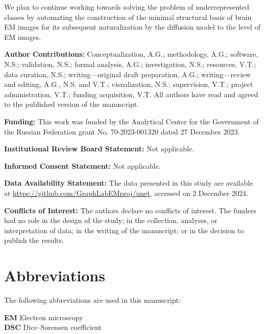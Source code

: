 \documentclass[journal,article,submit,pdftex,moreauthors]{Definitions/mdpi}
\begin{document}
We plan to continue working towards solving the problem of underrepresented classes by automating the construction of the minimal structural basis of brain EM images for its subsequent naturalization by the diffusion model to the level of EM images.

\vspace{18pt}

{\small
\noindent \textbf{Author Contributions:} Conceptualization, A.G.; methodology, A.G.; software, N.S.; validation, N.S.; formal analysis, A.G.; investigation, N.S.; resources, V.T.; data curation, N.S.; writing—original draft preparation, A.G.; writing—review and editing, A.G., N.S. and V.T.; visualization, N.S.; supervision, V.T.; project administration, V.T.; funding acquisition, V.T. All authors have read and agreed to the published version of the manuscript.

\vspace{6pt}

\noindent \textbf{Funding:} This work was funded by the Analytical Center for the Government of the Russian Federation grant No. 70-2023-001320 dated 27 December 2023.

\vspace{6pt}

\noindent \textbf{Institutional Review Board Statement:} Not applicable.

\vspace{6pt}

\noindent \textbf{Informed Consent Statement:} Not applicable.

\vspace{6pt}

\noindent \textbf{Data Availability Statement:} The data presented in this study are available at \url{https://github.com/GraphLabEMproj/unet}, accessed on 2 December 2024.

\vspace{6pt}

\noindent \textbf{Conflicts of Interest:} The authors declare no conflicts of interest. The funders had no role in the design of the study; in the collection, analyses, or interpretation of data; in the writing of the manuscript; or in the decision to publish the results.
}

\vspace{12pt}

\section*{Abbreviations}
{\small
\noindent The following abbreviations are used in this manuscript:

\vspace{6pt}

\noindent \textbf{EM} \quad Electron microscopy \\
\noindent \textbf{DSC} \quad Dice–Sorensen coefficient
}
\end{document}
